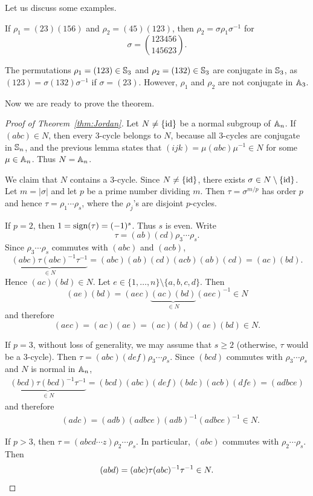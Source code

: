 Let us discuss some examples.

\begin{example}
If $\rho_1=(23)(156)$ and $\rho_2=(45)(123)$, then 
$\rho_2=\sigma\rho_1\sigma^{-1}$ for  
\[
\sigma=\binom{123456}{145623}.
\]
\end{example}

\begin{example}
The permutations $\rho_1=(123)\in\mathbb{S}_3$ and $\rho_2=(132)\in\mathbb{S}_3$ are conjugate 
in $\mathbb{S}_3$, as  
$(123)=\sigma(132)\sigma^{-1}$ if $\sigma=(23)$. However, $\rho_1$ and $\rho_2$ are not conjugate in $\mathbb{A}_3$. 
\end{example}

Now we are ready to prove the theorem. 

\begin{proof}[Proof of Theorem~\ref{thm:Jordan}]
Let $N\ne\{\operatorname{id}\}$ be a normal subgroup of $\mathbb{A}_n$. If $(abc)\in N$, then every 3-cycle belongs to $N$, because all 3-cycles 
are conjugate in $\mathbb{S}_n$, and the previous lemma 
states that 
$(ijk)=\mu(abc)\mu^{-1}\in N$ for some
$\mu\in\mathbb{A}_n$. Thus $N=\mathbb{A}_n$. 

We claim that $N$ contains a 3-cycle. 
Since $N\ne\{\operatorname{id}\}$, there exists $\sigma\in N\setminus\{\operatorname{id}\}$. Let $m=|\sigma|$ and let $p$ be a prime number dividing $m$. 
Then $\tau=\sigma^{m/p}$ has order $p$ and hence
$\tau=\rho_1\cdots\rho_s$, where the $\rho_j$'s are disjoint 
$p$-cycles. 

If $p=2$, then $1=\operatorname{sign}(\tau)=(-1)^s$. Thus $s$ is even. Write
\[
\tau=(ab)(cd)\rho_3\cdots\rho_s. 
\]
Since $\rho_3\cdots\rho_s$ commutes with $(abc)$ and $(acb)$, 
\[
\underbrace{(abc)\tau(abc)^{-1}\tau^{-1}}_{\in N}
=(abc)(ab)(cd)(acb)(ab)(cd)=(ac)(bd).
\]
Hence $(ac)(bd)\in N$. Let 
$e\in\{1,\dots,n\}\setminus\{a,b,c,d\}$. Then 
\[
(ae)(bd)=(aec)\underbrace{(ac)(bd)}_{\in N}(aec)^{-1}\in N
\]
and therefore  
\[
(aec)=(ac)(ae)=(ac)(bd)(ae)(bd)\in N.
\]

If $p=3$, without loss of generality, we may assume that $s\geq2$ (otherwise, $\tau$ would be a 3-cycle). Then
$\tau=(abc)(def)\rho_3\cdots\rho_s$. Since $(bcd)$ commutes with
$\rho_3\cdots\rho_s$ and $N$ is normal in $\mathbb{A}_n$, 
\begin{align*}
\underbrace{(bcd)\tau(bcd)^{-1}\tau^{-1}}_{\in N}=(bcd)(abc)(def)(bdc)(acb)(dfe)=(adbce)
\end{align*}
and therefore 
\begin{align*}
&(adc)=(adb)(adbce)(adb)^{-1}(adbce)^{-1}\in N.
\end{align*}

If $p>3$, then $\tau=(abcd\cdots z)\rho_2\cdots\rho_s$. In particular, $(abc)$ commutes with $\rho_2\cdots\rho_s$. Then 
\[
(abd)=(abc)\tau(abc)^{-1}\tau^{-1}\in N.\qedhere
\]
\end{proof}

